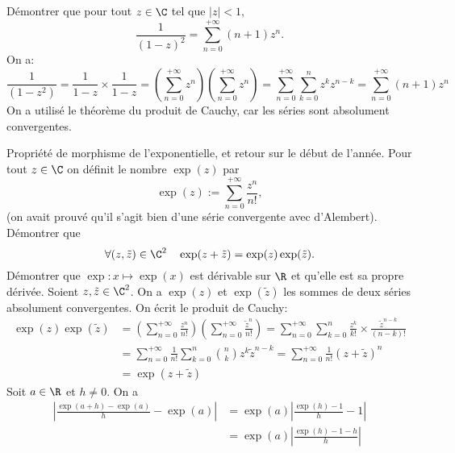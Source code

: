 \documentclass[11pt]{article}
\begin{document}
\begin{ex}{}{}
    Démontrer que pour tout $z\in\C$ tel que $|z|<1$,
    \begin{equation*}
        \frac{1}{(1-z)^2}=\sum_{n=0}^{+\infty}(n+1)z^n.
    \end{equation*}
    \tcblower
    On a:
    \begin{equation*}
        \frac{1}{(1-z^2)}=\frac{1}{1-z}\times\frac{1}{1-z}=\left(\sum_{n=0}^{+\infty}z^n\right)\left(\sum_{n=0}^{+\infty}z^n\right)=\sum_{n=0}^{+\infty}\sum_{k=0}^nz^kz^{n-k}=\sum_{n=0}^{+\infty}(n+1)z^n
    \end{equation*}
    On a utilisé le théorème du produit de Cauchy, car les séries sont absolument convergentes.
\end{ex}

\begin{ex}{Propriété de morphisme de l'exponentielle, et retour sur le début de l'année.}{}
    Pour tout $z\in\C$ on définit le nombre $\exp(z)$ par
    \begin{equation*}
        \exp(z):=\sum_{n=0}^{+\infty}\frac{z^n}{n!},
    \end{equation*}
    (on avait prouvé qu'il s'agit bien d'une série convergente avec d'Alembert).\n
    Démontrer que
    \begin{equation*}
        \forall (z,\tilde{z})\in\C^2\quad\exp(z+\tilde{z})=\exp(z)\exp(\tilde{z}).
    \end{equation*}
    Démontrer que $\exp:x\mapsto\exp(x)$ est dérivable sur $\R$ et qu'elle est sa propre dérivée.
    \tcblower
    Soient $z,\tilde{z}\in\C^2$. On a $\exp(z)$ et $\exp(\tilde{z})$ les sommes de deux séries absolument convergentes.
    On écrit le produit de Cauchy:
    \begin{align*}
        \exp(z)\exp(\tilde{z})&=\left(\sum_{n=0}^{+\infty}\frac{z^n}{n!}\right)\left( \sum_{n=0}^{+\infty}\frac{\tilde{z}^n}{n!} \right)=\sum_{n=0}^{+\infty}\sum_{k=0}^n\frac{z^k}{k!}\times\frac{\tilde{z}^{n-k}}{(n-k)!}\\
        &=\sum_{n=0}^{+\infty}\frac{1}{n!}\sum_{k=0}^{n}\binom{n}{k}z^{k}\tilde{z}^{n-k}=\sum_{n=0}^{+\infty}\frac{1}{n!}(z+\tilde{z})^n\\
        &=\exp(z+\tilde{z})
    \end{align*}
    Soit $a\in \R$ et $h\neq0$. On a
    \begin{align*}
        \left|\frac{\exp(a+h)-\exp(a)}{h}-\exp(a)\right|&=\exp(a)\left| \frac{\exp(h)-1}{h} - 1 \right|\\
        &=\exp(a)\left| \frac{\exp(h)-1-h}{h} \right|\\

\end{align*}
\end{ex}
\end{document}
